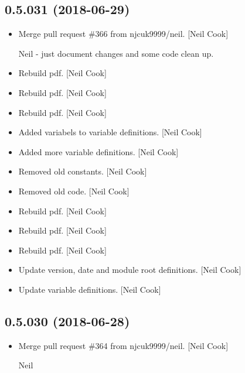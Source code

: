 \documentclass[a4paper,10pt,english]{report}
\begin{document}
\subsection{0.5.031 (2018-06-29)}
\label{\detokenize{misc/changelog:id405}}\begin{itemize}
\item {} 
Merge pull request \#366 from njcuk9999/neil. {[}Neil Cook{]}

Neil - just document changes and some code clean up.

\item {} 
Rebuild pdf. {[}Neil Cook{]}

\item {} 
Rebuild pdf. {[}Neil Cook{]}

\item {} 
Rebuild pdf. {[}Neil Cook{]}

\item {} 
Added variabels to  variable definitions. {[}Neil Cook{]}

\item {} 
Added more  variable definitions. {[}Neil Cook{]}

\item {} 
Removed old  constants. {[}Neil Cook{]}

\item {} 
Removed old  code. {[}Neil Cook{]}

\item {} 
Rebuild pdf. {[}Neil Cook{]}

\item {} 
Rebuild pdf. {[}Neil Cook{]}

\item {} 
Rebuild pdf. {[}Neil Cook{]}

\item {} 
Update version, date and module root definitions. {[}Neil Cook{]}

\item {} 
Update variable definitions. {[}Neil Cook{]}

\end{itemize}


\subsection{0.5.030 (2018-06-28)}
\label{\detokenize{misc/changelog:id406}}\begin{itemize}
\item {} 
Merge pull request \#364 from njcuk9999/neil. {[}Neil Cook{]}

Neil

\end{itemize}
\end{document}
